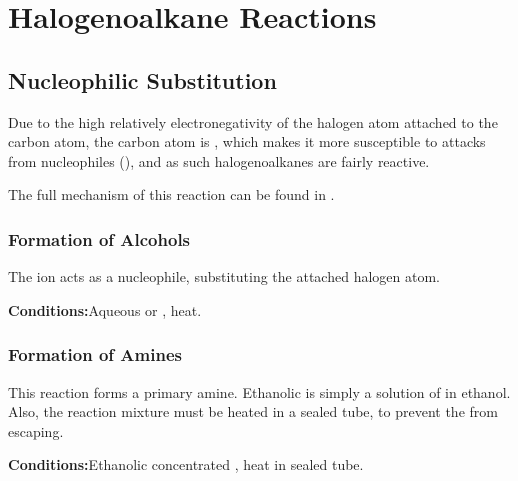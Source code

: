 	\pagebreak
	\section{Halogenoalkane Reactions}

		\subsection{Nucleophilic Substitution}

			Due to the high relatively electronegativity of the halogen atom attached to the carbon atom, the carbon atom is
			, which makes it more susceptible to attacks from nucleophiles (), and
			as such halogenoalkanes are fairly reactive.

			The full mechanism of this reaction can be found in \hyperlink{AppendixNucleophilicSubstitution}{}.

			\subsubsection{Formation of Alcohols}

				The  ion acts as a nucleophile, substituting the attached halogen atom.

				\vspace{1.5em}
				\vbox{\textbf{Conditions:}\tabto{35mm}Aqueous  or , heat.}

				\diagram[1.0]{
					\schemestart[0, 1.5, thick]
						\chemfig{!\molR-[:0]!\molX}
						\hspace{2mm} + \hspace{2mm}
						\chemfig{!\molOH\mch}
						\arrow
						\chemfig{!\molR-[:0]!\molOH}
						\hspace{2mm} + \hspace{2mm}
						\chemfig{!\molX\mch}
					\schemestop
				}


			\hypertarget{NucleophilicSubstitutionFormingAmines}{}
			\subsubsection{Formation of Amines}

				This reaction forms a primary amine. Ethanolic  is simply a solution of  in ethanol. Also, the reaction
				mixture must be heated in a sealed tube, to prevent the  from escaping.

				\vspace{1.5em}
				\vbox{\textbf{Conditions:}\tabto{35mm}Ethanolic concentrated , heat in sealed tube.}

